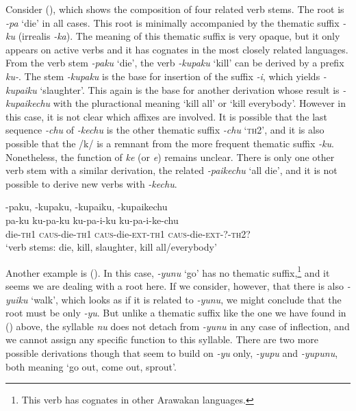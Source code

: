 Consider (), which shows the composition of four related verb stems. The root is \textit{-pa} ‘die’ in all cases. This root is minimally accompanied by the thematic suffix \textit{-ku} (irrealis \textit{-ka}). The meaning of this thematic suffix is very opaque, but it only appears on active verbs and it has cognates in the most closely related languages. From the verb stem \textit{-paku} ‘die’, the verb \textit{-kupaku} ‘kill’ can be derived by a  prefix \textit{ku-}. The stem \textit{-kupaku} is the base for insertion of the  suffix \textit{-i}, which yields \textit{-kupaiku} ‘slaughter’. This again is the base for another derivation whose result is \textit{-kupaikechu} with the pluractional meaning ‘kill all’ or ‘kill everybody’. However in this case, it is not clear which affixes are involved. It is possible that the last sequence \textit{-chu} of \textit{-kechu} is the other thematic suffix \textit{-chu} ‘\textsc{th}2’, and it is also possible that the /k/ is a remnant from the more frequent thematic suffix \textit{-ku}. Nonetheless, the function of \textit{ke} (or \textit{e}) remains unclear. There is only one other verb stem with a similar derivation, the related \textit{-paikechu} ‘all die’, and it is not possible to derive new verbs with \textit{-kechu}.

\ea\label{ex:VerbStems-1}
\begingl
\glpreamble -paku, -kupaku, -kupaiku, -kupaikechu\\
\gla pa-ku ku-pa-ku ku-pa-i-ku ku-pa-i-ke-chu\\
\glb die-\textsc{th}1 \textsc{caus}-die-\textsc{th}1 \textsc{caus}-die-\textsc{ext}-\textsc{th}1 \textsc{caus}-die-\textsc{ext}-?-\textsc{th}2?\\
\glft ‘verb stems: die, kill, slaughter, kill all/everybody’
\endgl
\xe

Another example is (). In this case, \textit{-yunu} ‘go’ has no thematic suffix,\footnote{This verb has cognates in other Arawakan languages.} and it seems we are dealing with a root here. If we consider, however, that there is also \textit{-yuiku} ‘walk’, which looks as if it is related to \textit{-yunu}, we might conclude that the root must be only \textit{-yu}. But unlike a thematic suffix like the one we have found in () above, the syllable \textit{nu} does not detach from \textit{-yunu} in any case of inflection, and we cannot assign any specific function to this syllable. There are two more possible derivations though that seem to build on \textit{-yu} only, \textit{-yupu} and \textit{-yupunu}, both meaning ‘go out, come out, sprout’.

